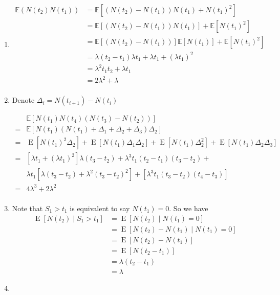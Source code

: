 \documentclass[  11pt]{article}
\newcommand{\e}{ \operatorname{E}}
\newcommand{\la}{\lambda}
\begin{document}
\begin{ExerciseList}
\begin{enumerate}
\item \[\begin{split}
\mathbb{E}(N(t_2)N(t_1)) & = \mathbb{E}[(N(t_2)-N(t_1))N(t_1)+N(t_1)^2] \\
& = \mathbb{E}[(N(t_2)-N(t_1))N(t_1)] +\mathbb{E}[N(t_1)^2] \\
& = \mathbb{E}[(N(t_2)-N(t_1))]\mathbb{E}[N(t_1)] +\mathbb{E}[N(t_1)^2] \\
& = \lambda (t_2-t_1)\lambda t_1 + \lambda t_1 + (\lambda t_1)^2 \\ 
& = \lambda^2 t_1 t_2 + \lambda t_1\\
& = 2\lambda^2+\lambda\\
\end{split} \]

\item Denote $\Delta_i = N(t_{i+1}) - N(t_{i})$\par
\[\begin{split}
& \mathbb{E} [N(t_1)N(t_4)(N(t_3) -N(t_2))] \\
= & \mathbb{E}[N(t_1)(N(t_1)+\Delta_1+\Delta_2+\Delta_3)\Delta_2]\\
= & \e[N(t_1)^2 \Delta_2] + \e[N(t_1)\Delta_1\Delta_2]+\e[N(t_1)\Delta_2^2] + \e[N(t_1)\Delta_2 \Delta_3]\\
=& [\la t_1 + (\la t_1)^2]\la (t_3-t_2) + \la^3 t_1(t_2-t_1)(t_3-t_2)+\\
& \la t_1[\la(t_3-t_2)+\la^2(t_3-t_2)^2]+[\la^3 t_1 (t_3-t_2)(t_4-t_3)] \\
= & 4\lambda^3+2\lambda^2\\
\end{split}\]

\item Note that $S_1 > t_1$ is equivalent to say $N(t_1) = 0$. So we have
\[\begin{split}
\e [N(t_2)\mid S_1 > t_1] & = \e[N(t_2)\mid N(t_1)=0] \\
& = \e[N(t_2)-N(t_1)\mid N(t_1)=0] \\
& = \e[N(t_2)-N(t_1)] \\
& = \e[N(t_2-t_1)] \\
& = \lambda(t_2-t_1) \\
& = \lambda
\end{split}\]

\item 


\end{enumerate}
\end{ExerciseList}
\end{document}
